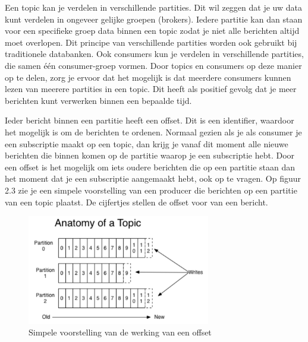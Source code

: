  Een topic kan je verdelen in verschillende partities. Dit wil zeggen dat je uw data kunt verdelen in ongeveer gelijke groepen (brokers). Iedere partitie kan dan staan voor een specifieke groep data binnen een topic zodat je niet alle berichten altijd moet overlopen. Dit principe van verschillende partities worden ook gebruikt bij traditionele databanken. Ook consumers kun je verdelen in verschillende partities, die samen één consumer-groep vormen. Door topics en consumers op deze manier op te delen, zorg je ervoor dat het mogelijk is dat meerdere consumers kunnen lezen van meerere partities in een topic. Dit heeft als positief gevolg dat je meer berichten kunt verwerken binnen een bepaalde tijd. 
 
 Ieder bericht binnen een partitie heeft een offset. Dit is een identifier, waardoor het mogelijk is om de berichten te ordenen. Normaal gezien als je als consumer je een subscriptie maakt op een topic, dan krijg je vanaf dit moment alle nieuwe berichten die binnen komen op de partitie waarop je een subscriptie hebt. Door een offset is het mogelijk om iets oudere berichten die op een partitie staan dan het moment dat je een subscriptie aangemaakt hebt, ook op te vragen. Op figuur 2.3 zie je een simpele voorstelling van een producer die berichten op een partitie van een topic plaatst. De cijfertjes stellen de offset voor van een bericht.
 \begin{figure}[h!]
     \centering
     \includegraphics[width=80mm]{../kafkaOffset.png}
     \caption{Simpele voorstelling van de werking van een offset}
     
 \end{figure}

